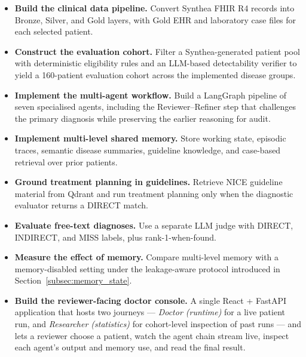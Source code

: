 \begin{itemize}

  \item \textbf{Build the clinical data pipeline.} Convert Synthea FHIR R4
  records into Bronze, Silver, and Gold layers, with Gold EHR and laboratory
  case files for each selected patient.

  \item \textbf{Construct the evaluation cohort.} Filter a Synthea-generated
  patient pool with deterministic eligibility rules and an LLM-based
  detectability verifier to yield a 160-patient evaluation cohort across the
  implemented disease groups.

  \item \textbf{Implement the multi-agent workflow.} Build a LangGraph
  pipeline of seven specialised agents, including the Reviewer--Refiner
  step that challenges the primary diagnosis while preserving the
  earlier reasoning for audit.

  \item \textbf{Implement multi-level shared memory.} Store working state,
  episodic traces, semantic disease summaries, guideline knowledge, and
  case-based retrieval over prior patients.

  \item \textbf{Ground treatment planning in guidelines.} Retrieve NICE
  guideline material from Qdrant and run treatment planning only when the
  diagnostic evaluator returns a DIRECT match.

  \item \textbf{Evaluate free-text diagnoses.} Use a separate LLM judge with
  DIRECT, INDIRECT, and MISS labels, plus rank-1-when-found.

  \item \textbf{Measure the effect of memory.} Compare multi-level memory
  with a memory-disabled setting under the leakage-aware protocol
  introduced in Section~\ref{subsec:memory_state}.

  \item \textbf{Build the reviewer-facing doctor console.} A single React +
  FastAPI application that hosts two journeys --- \emph{Doctor (runtime)} for
  a live patient run, and \emph{Researcher (statistics)} for cohort-level
  inspection of past runs --- and lets a reviewer choose a patient, watch the
  agent chain stream live, inspect each agent's output and memory use, and
  read the final result.

\end{itemize}

